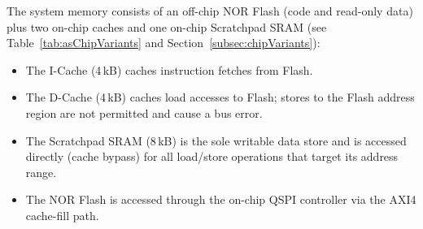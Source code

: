 The system memory consists of an off-chip NOR Flash (code and read-only
data) plus two on-chip caches and one on-chip Scratchpad SRAM
(see Table~\ref{tab:asChipVariants} and Section~\ref{subsec:chipVariants}):
\begin{itemize}
  \item The I-Cache (4\,kB) caches instruction fetches from Flash.
  \item The D-Cache (4\,kB) caches load accesses to Flash; stores to the Flash
    address region are not permitted and cause a bus error.
  \item The Scratchpad SRAM (8\,kB) is the sole writable data store and is
    accessed directly (cache bypass) for all load/store operations that
    target its address range.
  \item The NOR Flash is accessed through the on-chip QSPI controller via the
    AXI4 cache-fill path.
\end{itemize}

